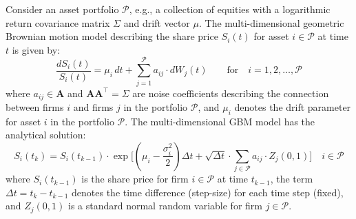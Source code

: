 \documentclass[11pt]{article}
\theoremstyle{definition}
\begin{document}
Consider an asset portfolio $\mathcal{P}$, e.g., a collection of equities with a logarithmic return covariance matrix $\Sigma$ and drift vector $\mu$.
The multi-dimensional geometric Brownian motion model describing the share price $S_{i}(t)$ for asset $i\in\mathcal{P}$ at time $t$ is given by: 
\begin{equation*}
\frac{dS_{i}\left(t\right)}{S_{i}(t)} = \mu_{i}\,{dt}+\sum_{j=1}^{\mathcal{P}}a_{ij}\cdot{dW_{j}(t)}\qquad\text{for}\quad{i=1,2,\dots,\mathcal{P}}
\end{equation*}
where $a_{ij}\in\mathbf{A}$ and $\mathbf{A}\mathbf{A}^{\top} = \Sigma$ are noise coefficients describing the connection between firms $i$ and firms $j$ in the portfolio $\mathcal{P}$,
and $\mu_{i}$ denotes the drift parameter for asset $i$ in the portfolio $\mathcal{P}$.
The multi-dimensional GBM model has the analytical solution:
\begin{equation*}
S_{i}(t_{k}) = S_{i}(t_{k-1})\cdot\exp\Biggl[\left(\mu_{i}-\frac{\sigma_{i}^{2}}{2}\right)\Delta{t} + \sqrt{\Delta{t}}\cdot\sum_{j\in\mathcal{P}}a_{ij}\cdot{Z_{j}(0,1)}\Biggr]\quad{i\in\mathcal{P}}
\end{equation*}
where $S_{i}(t_{k-1})$ is the share price for firm $i\in\mathcal{P}$ at time $t_{k-1}$,  the term $\Delta{t} = t_{k} - t_{k-1}$ denotes the time difference (step-size) 
for each time step (fixed), and $Z_{j}(0,1)$ is a standard normal random variable for firm $j\in\mathcal{P}$.
\end{document}
